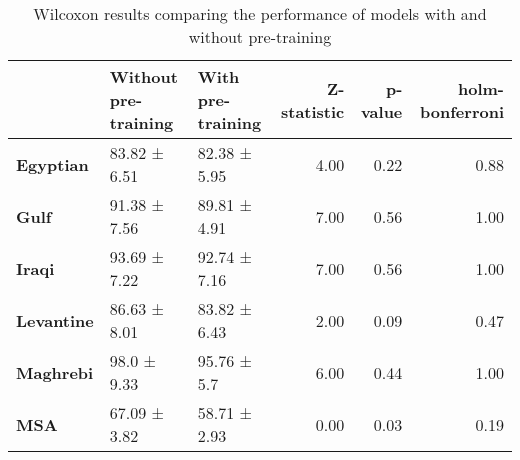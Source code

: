 \begin{table}
\caption{Wilcoxon results comparing the performance of models with and without pre-training}
\label{tab:ttest}
\begin{tabular}{lllrrr}
\toprule
 & Without pre-training & With pre-training & Z-statistic & p-value & holm-bonferroni \\
\midrule
\textbf{Egyptian} & 83.82 ± 6.51 & 82.38 ± 5.95 & 4.00 & 0.22 & 0.88 \\
\textbf{Gulf} & 91.38 ± 7.56 & 89.81 ± 4.91 & 7.00 & 0.56 & 1.00 \\
\textbf{Iraqi} & 93.69 ± 7.22 & 92.74 ± 7.16 & 7.00 & 0.56 & 1.00 \\
\textbf{Levantine} & 86.63 ± 8.01 & 83.82 ± 6.43 & 2.00 & 0.09 & 0.47 \\
\textbf{Maghrebi} & 98.0 ± 9.33 & 95.76 ± 5.7 & 6.00 & 0.44 & 1.00 \\
\textbf{MSA} & 67.09 ± 3.82 & 58.71 ± 2.93 & 0.00 & 0.03 & 0.19 \\
\bottomrule
\end{tabular}
\end{table}
